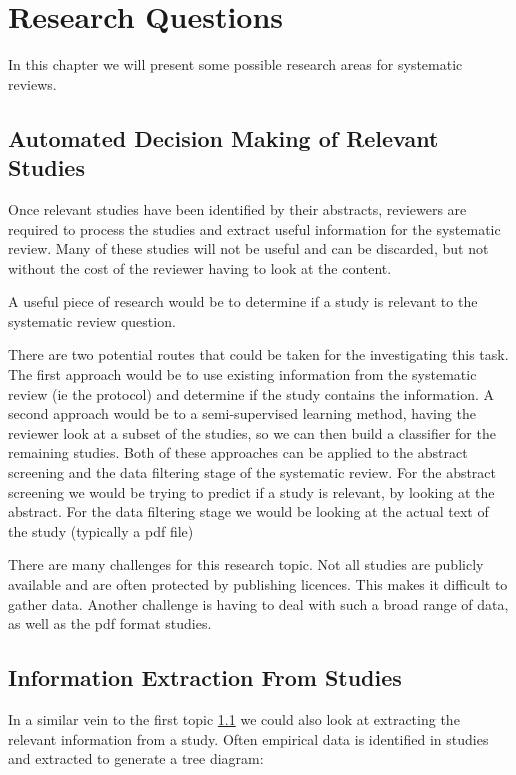 \chapter{Research Questions} \label{rq}

In this chapter we will present some possible research areas for systematic reviews.

\section{Automated Decision Making of Relevant Studies} \label{dm}

Once relevant studies have been identified by their abstracts, reviewers are required to process the studies and extract useful information for the systematic review. Many of these studies will not be useful and can be discarded, but not without the cost of the reviewer having to look at the content.

A useful piece of research would be to determine if a study is relevant to the systematic review question. 

There are two potential routes that could be taken for the investigating this task. The first approach would be to use existing information from the systematic review (ie the protocol) and determine if the study contains the information. A second approach would be to a semi-supervised learning method, having the reviewer look at a subset of the studies, so we can then build a classifier for the remaining studies. Both of these approaches can be applied to the abstract screening and the data filtering stage of the systematic review. For the abstract screening we would be trying to predict if a study is relevant, by looking at the abstract. For the data filtering stage we would be looking at the actual text of the study (typically a pdf file)

There are many challenges for this research topic. Not all studies are publicly available and are often protected by publishing licences. This makes it difficult to gather data. Another challenge is having to deal with such a broad range of data, as well as the pdf format studies.

\section{Information Extraction From Studies} \label{ie}

In a similar vein to the first topic \ref{dm} we could also look at extracting the relevant information from a study. Often empirical data is identified in studies and extracted to generate a tree diagram:

